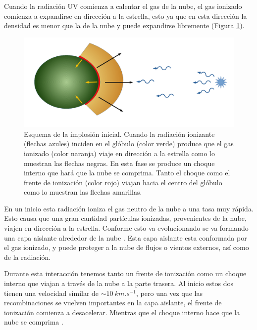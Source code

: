 \documentclass{book}
\begin{document}
Cuando la radiación UV comienza a calentar el gas de la nube, el gas ionizado comienza a expandirse en dirección a la estrella, esto ya que en esta dirección la densidad es menor que la de la nube y puede expandirse libremente (Figura \ref{fig:evolucion de la nube}). 

\begin{figure}[htb]
    \centering
    \includegraphics[width= \textwidth]{ultimos/implosion_inicial.pdf}
    \caption{Esquema de la implosión inicial. Cuando la radiación ionizante (flechas azules) inciden en el glóbulo (color verde)  produce que el gas ionizado (color naranja) viaje en dirección a la estrella como lo muestran las flechas negras. En esta fase se produce un choque interno que hará que la nube se comprima. Tanto el choque como el frente de ionización  (color rojo) viajan hacia el centro del glóbulo como lo muestran las flechas amarillas.}
    \label{fig:evolucion de la nube}
\end{figure}

En un inicio esta radiación ioniza el gas neutro de la nube a una tasa muy rápida. Esto causa que una gran cantidad partículas ionizadas, provenientes de la nube, viajen en dirección a la estrella. Conforme esto va evolucionando se va formando una capa aislante alrededor de la nube \citep{OortySpitzer_1955}. Esta capa aislante esta conformada por el gas ionizado, y puede proteger a la nube de flujos o vientos externos, así como de la radiación.

Durante esta interacción tenemos tanto un frente de ionización como un choque interno que viajan a través de la nube a la parte trasera. Al inicio estos dos tienen una velocidad similar de $\sim\SI{10}{km.s^{-1}}$, pero una vez que las recombinaciones se vuelven importantes en la capa aislante, el frente de ionización comienza a desacelerar. Mientras que el choque interno hace que la nube se comprima \citep{Bertoldi_1989}.
\end{document}
